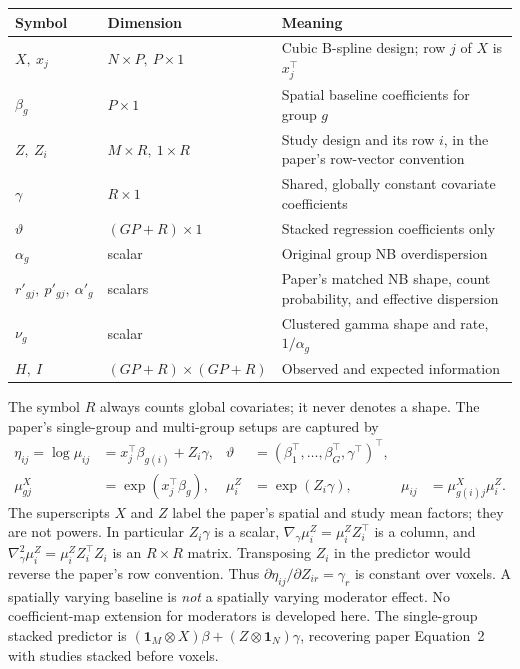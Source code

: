 \documentclass[11pt,a4paper]{article}
\numberwithin{equation}{section}
\begin{document}
\begin{center}
\begin{tabularx}{\textwidth}{l l T}
\toprule
Symbol & Dimension & Meaning\\
\midrule
$X,\ x_j$ & $N\times P,\ P\times1$ & Cubic B-spline design;
row $j$ of $X$ is $x_j^\top$\\
$\beta_g$ & $P\times1$ & Spatial baseline coefficients for group $g$\\
$Z,\ Z_i$ & $M\times R,\ 1\times R$ & Study design and its
row $i$, in the paper's row-vector convention\\
$\gamma$ & $R\times1$ & Shared, globally constant covariate coefficients\\
$\vartheta$ & $(GP+R)\times1$ & Stacked regression coefficients only\\
$\alpha_g$ & scalar & Original group NB overdispersion\\
$r'_{gj},\ p'_{gj},\ \alpha'_g$ & scalars & Paper's matched NB
shape, count probability, and effective dispersion\\
$\nu_g$ & scalar & Clustered gamma shape and rate, $1/\alpha_g$\\
$H,\ I$ & $(GP+R)\times(GP+R)$ & Observed and expected information\\
\bottomrule
\end{tabularx}
\end{center}
The symbol $R$ always counts global covariates; it never denotes a shape.
The paper's single-group and multi-group setups are captured by
\begin{align}
 \eta_{ij}=\log\mu_{ij}
 &=x_j^\top\beta_{g(i)}+{Z_i}\gamma,
 &\vartheta&=(\beta_1^\top,\ldots,\beta_G^\top,\gamma^\top)^\top,
 \label{eq:predictor}\\
 \mu_{gj}^X&=\exp(x_j^\top\beta_g),
 &\mu_i^Z&=\exp({Z_i}\gamma),&
 \mu_{ij}&=\mu_{g(i)j}^X\mu_i^Z. \label{eq:separable}
\end{align}
The superscripts $X$ and $Z$ label the paper's spatial and study
mean factors; they are not powers. In particular $Z_i\gamma$ is
a scalar, $\nabla_\gamma\mu_i^Z=\mu_i^Z Z_i^\top$ is a column,
and $\nabla_\gamma^2\mu_i^Z=\mu_i^Z Z_i^\top Z_i$ is an $R\times R$
matrix. Transposing $Z_i$ in the predictor would reverse the
paper's row convention.
Thus $\partial\eta_{ij}/\partial Z_{ir}=\gamma_r$ is constant over voxels.
A spatially varying baseline is \emph{not} a spatially varying moderator
effect. No coefficient-map extension for moderators is developed here.
The single-group stacked predictor is
$(\mathbf1_M\otimes X)\beta+(Z\otimes\mathbf1_N)\gamma$,
recovering paper Equation~2 with studies stacked before voxels.
\end{document}
